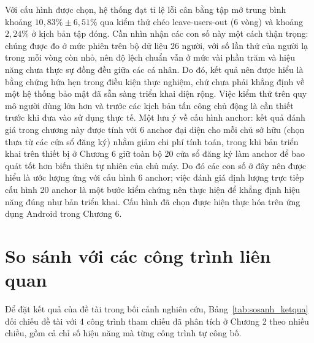 \documentclass[../DoAn.tex]{subfiles}
\begin{document}
Với cấu hình được chọn, hệ thống đạt tỉ lệ lỗi cân bằng tập mở trung bình khoảng $10,83\% \pm 6,51\%$ qua kiểm thử chéo leave-users-out (6 vòng) và khoảng $2,24\%$ ở kịch bản tập đóng. Cần nhìn nhận các con số này một cách thận trọng: chúng được đo ở mức phiên trên bộ dữ liệu 26 người, với số lần thử của người lạ trong mỗi vòng còn nhỏ, nên độ lệch chuẩn vẫn ở mức vài phần trăm và hiệu năng chưa thực sự đồng đều giữa các cá nhân. Do đó, kết quả nên được hiểu là bằng chứng hứa hẹn trong điều kiện thực nghiệm, chứ chưa phải khẳng định về một hệ thống bảo mật đã sẵn sàng triển khai diện rộng. Việc kiểm thử trên quy mô người dùng lớn hơn và trước các kịch bản tấn công chủ động là cần thiết trước khi đưa vào sử dụng thực tế. Một lưu ý về cấu hình anchor: kết quả đánh giá trong chương này được tính với 6 anchor đại diện cho mỗi chủ sở hữu (chọn thưa từ các cửa sổ đăng ký) nhằm giảm chi phí tính toán, trong khi bản triển khai trên thiết bị ở Chương 6 giữ toàn bộ 20 cửa sổ đăng ký làm anchor để bao quát tốt hơn biến thiên tự nhiên của chủ máy. Do đó các con số ở đây nên được hiểu là ước lượng ứng với cấu hình 6 anchor; việc đánh giá định lượng trực tiếp cấu hình 20 anchor là một bước kiểm chứng nên thực hiện để khẳng định hiệu năng đúng như bản triển khai. Cấu hình đã chọn được hiện thực hóa trên ứng dụng Android trong Chương 6.

\section{So sánh với các công trình liên quan}
\label{sec:sosanh}

Để đặt kết quả của đề tài trong bối cảnh nghiên cứu, Bảng~\ref{tab:sosanh_ketqua} đối chiếu đề tài với 4 công trình tham chiếu đã phân tích ở Chương 2 theo nhiều chiều, gồm cả chỉ số hiệu năng mà từng công trình tự công bố.
\end{document}
